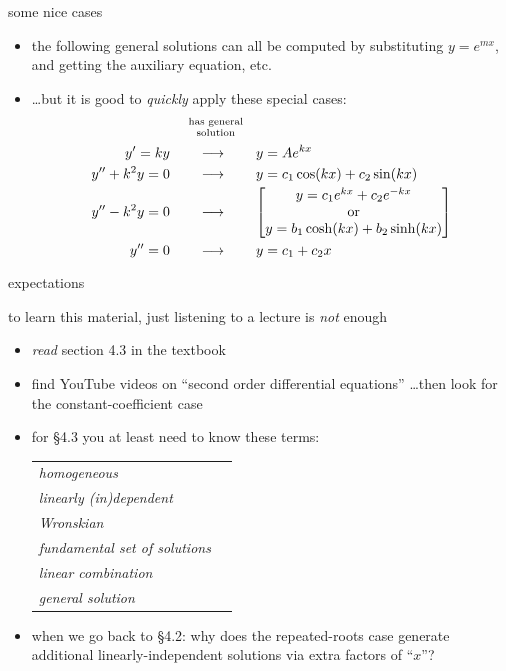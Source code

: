 \documentclass{beamer}
\begin{document}
\begin{frame}{some nice cases}

\begin{itemize}
\item the following general solutions can all be computed by substituting $y=e^{mx}$, and getting the auxiliary equation, etc.
\item \dots but it is good to \emph{quickly} apply these special cases:
\newcommand{\genarrow}{\qquad \longrightarrow \qquad}
\begin{align*}
 &\quad\,\, {\scriptsize \begin{matrix} \text{has general} \\ \text{solution} \end{matrix} } \\
y' = k y &\genarrow y=Ae^{kx} \\
y'' + k^2 y = 0 &\genarrow y=c_1\cos(kx) + c_2\sin(kx) \\
y'' - k^2 y = 0 &\genarrow \left[\begin{matrix} y=c_1e^{kx}+c_2e^{-kx} \\
                                      \text{or} \\
                                      y=b_1\cosh(k x) + b_2\sinh(k x)\end{matrix}\right] \\
y'' = 0 &\genarrow y=c_1 + c_2 x
\end{align*}
\end{itemize}
\end{frame}


\begin{frame}{expectations}

to learn this material, just listening to a lecture is \emph{not} enough
     \begin{itemize}
     \item \emph{read} section 4.3 in the textbook
     \item find YouTube videos on ``second order differential equations'' \dots then look for the constant-coefficient case
     \item for \S4.3 you at least need to know these terms:

\medskip
             \begin{tabular}{ll}
             \emph{homogeneous} \\
             \emph{linearly (in)dependent} \\
             \emph{Wronskian} \\
             \emph{fundamental set of solutions} \\
             \emph{linear combination} \\
             \emph{general solution}
             \end{tabular}

\medskip
     \item when we go back to \S4.2:  why does the repeated-roots case generate additional linearly-independent solutions via extra factors of ``$x$''?
     \end{itemize}
\end{frame}
\end{document}
